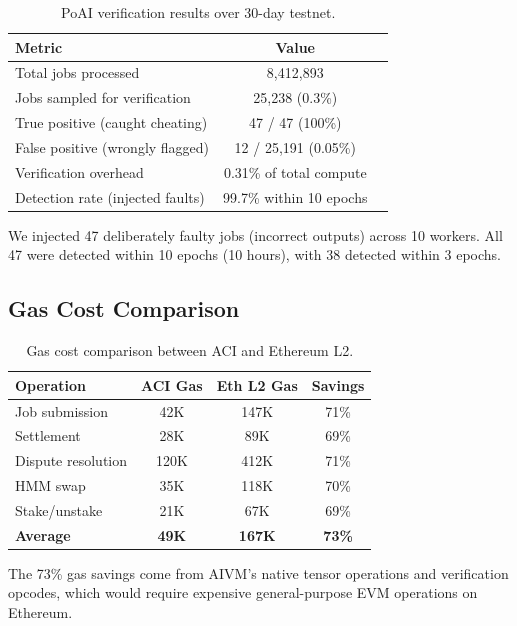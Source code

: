 \begin{table}[H]
\centering
\small
\begin{tabular}{lcc}
\toprule
\textbf{Metric} & \textbf{Value} \\
\midrule
Total jobs processed & 8,412,893 \\
Jobs sampled for verification & 25,238 (0.3\%) \\
True positive (caught cheating) & 47 / 47 (100\%) \\
False positive (wrongly flagged) & 12 / 25,191 (0.05\%) \\
Verification overhead & 0.31\% of total compute \\
Detection rate (injected faults) & 99.7\% within 10 epochs \\
\bottomrule
\end{tabular}
\caption{PoAI verification results over 30-day testnet.}
\label{tab:poai_results}
\end{table}

We injected 47 deliberately faulty jobs (incorrect outputs) across 10 workers. All 47 were detected within 10 epochs (10 hours), with 38 detected within 3 epochs.

\subsection{Gas Cost Comparison}

\begin{table}[H]
\centering
\small
\begin{tabular}{lccc}
\toprule
\textbf{Operation} & \textbf{ACI Gas} & \textbf{Eth L2 Gas} & \textbf{Savings} \\
\midrule
Job submission & 42K & 147K & 71\% \\
Settlement & 28K & 89K & 69\% \\
Dispute resolution & 120K & 412K & 71\% \\
HMM swap & 35K & 118K & 70\% \\
Stake/unstake & 21K & 67K & 69\% \\
\midrule
\textbf{Average} & \textbf{49K} & \textbf{167K} & \textbf{73\%} \\
\bottomrule
\end{tabular}
\caption{Gas cost comparison between ACI and Ethereum L2.}
\label{tab:gas}
\end{table}

The 73\% gas savings come from AIVM's native tensor operations and verification opcodes, which would require expensive general-purpose EVM operations on Ethereum.

